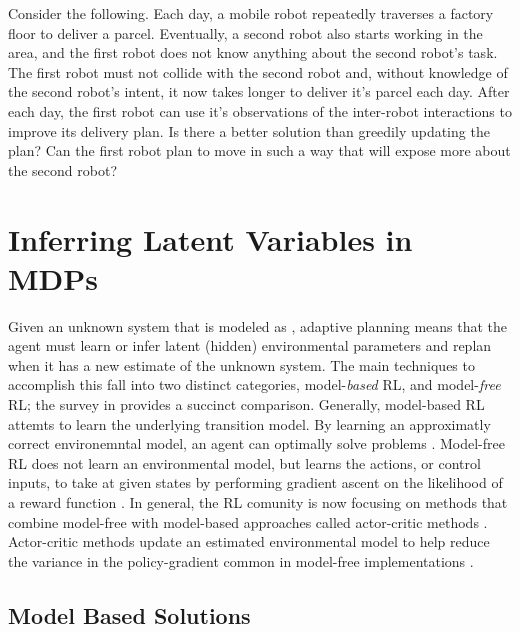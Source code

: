     Consider the following. Each day, a mobile robot repeatedly traverses a factory floor to deliver a parcel.
    Eventually, a second robot also starts working in the area, and the first robot does not know anything about the
    second robot's task. The first robot must not collide with the second robot and, without knowledge of the second
    robot's intent, it now takes longer to deliver it's parcel each day. After each day, the first robot can use it's
    observations of the inter-robot interactions to improve its delivery plan. Is there a better solution than greedily
    updating the plan?  Can the first robot plan to move in such a way that will expose more about the second robot?

\section{Inferring Latent Variables in MDPs}\label{sec:literature_hipmdp}


    Given an unknown system that is modeled as , adaptive planning \cite{hernandez2012adaptive} means that the
    agent must learn or infer latent (hidden) environmental parameters and replan when it has a new estimate of the
    unknown system. The main techniques to accomplish this fall into two distinct categories, model-\textit{based}
    \ac{RL}, and model-\textit{free} \ac{RL}; the survey in \cite{polydoros2017survey} provides a succinct comparison.
    Generally, model-based \ac{RL} attemts to learn the underlying transition model. By learning an approximatly correct
    environemntal model, an agent can optimally solve problems
    \cite{Fu-RSS-14}\cite{bertuccelli2012robust}\cite{deisenroth2011pilco}. Model-free \ac{RL} does not learn an
    environmental model, but learns the actions, or control inputs, to take at given states by performing gradient
    ascent on the likelihood of a reward function \cite{williams1992simple}\cite{peters2008reinforcement}. In general,
    the \ac{RL} comunity is now focusing on methods that combine model-free with model-based approaches called
    actor-critic methods \cite{konda2000actor}. Actor-critic methods update an estimated environmental model to help
    reduce the variance in the policy-gradient common in model-free implementations \cite{peters2008reinforcement}.

\subsection{Model Based Solutions}\label{sec:model_based_lit}

